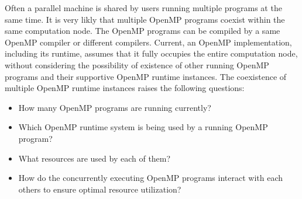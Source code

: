 Often a parallel machine is shared by users running multiple programs at the same time.
It is very likly that multiple OpenMP programs coexist within the same computation node. 
The OpenMP programs can be compiled by a same OpenMP compiler or different compilers. 
Current, an OpenMP implementation, including its runtime, assumes that it fully occupies the entire computation node,
without considering the possibility of existence of other running OpenMP programs and their supportive OpenMP runtime instances. 
The coexistence of multiple OpenMP runtime instances raises the following questions:
\begin{itemize}
\item How many OpenMP programs are running currently?
\item Which OpenMP runtime system is being used by a running OpenMP program?
\item What resources are used by each of them?
\item How do the concurrently executing OpenMP programs interact with each others to ensure optimal resource utilization?
\end{itemize}
